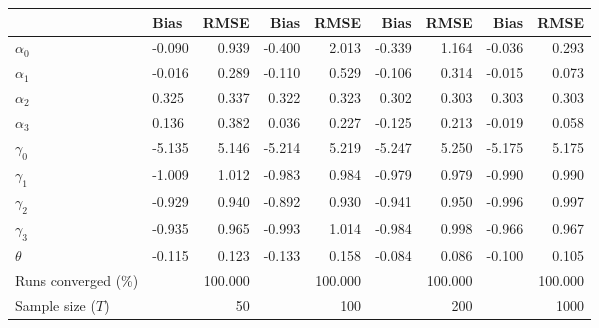 
\begin{tabular}[t]{llrrrrrrr}
\toprule
  & Bias & RMSE & Bias & RMSE & Bias & RMSE & Bias & RMSE\\
\midrule
$\alpha_{0}$ & -0.090 & 0.939 & -0.400 & 2.013 & -0.339 & 1.164 & -0.036 & 0.293\\
$\alpha_{1}$ & -0.016 & 0.289 & -0.110 & 0.529 & -0.106 & 0.314 & -0.015 & 0.073\\
$\alpha_{2}$ & 0.325 & 0.337 & 0.322 & 0.323 & 0.302 & 0.303 & 0.303 & 0.303\\
$\alpha_{3}$ & 0.136 & 0.382 & 0.036 & 0.227 & -0.125 & 0.213 & -0.019 & 0.058\\
$\gamma_{0}$ & -5.135 & 5.146 & -5.214 & 5.219 & -5.247 & 5.250 & -5.175 & 5.175\\
$\gamma_{1}$ & -1.009 & 1.012 & -0.983 & 0.984 & -0.979 & 0.979 & -0.990 & 0.990\\
$\gamma_{2}$ & -0.929 & 0.940 & -0.892 & 0.930 & -0.941 & 0.950 & -0.996 & 0.997\\
$\gamma_{3}$ & -0.935 & 0.965 & -0.993 & 1.014 & -0.984 & 0.998 & -0.966 & 0.967\\
$\theta$ & -0.115 & 0.123 & -0.133 & 0.158 & -0.084 & 0.086 & -0.100 & 0.105\\
Runs converged (\%) &  & 100.000 &  & 100.000 &  & 100.000 &  & 100.000\\
Sample size ($T$) &  & 50 &  & 100 &  & 200 &  & 1000\\
\bottomrule
\end{tabular}
